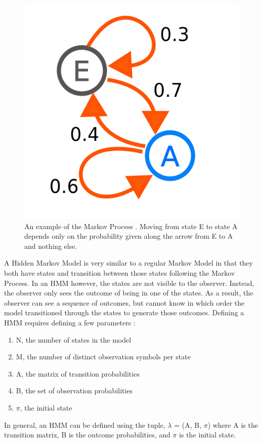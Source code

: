 \documentclass[letterpaper, 11pt]{article}%
\begin{document}
\begin{figure}
  \centering
  \includegraphics[scale=0.2]{process}
  \caption[Markov Process]
  {An example of the Markov Process \cite{markov}. Moving from state E to state A depends only on the probability given along the arrow from E to A and nothing else. }
\end{figure}  

A Hidden Markov Model is very similar to a regular Markov Model in that they both have states and transition between those states following the Markov Process. In an HMM however, the states are not visible to the observer. Instead, the observer only sees the outcome of being in one of the states. As a result, the observer can see a sequence of outcomes, but cannot know in which order the model transitioned through the states to generate those outcomes. 
Defining a HMM requires defining a few parameters \cite{Rabiner}:
\begin{enumerate}
  \item
  N, the number of states in the model
  \item
  M, the number of distinct observation symbols per state
  \item
  A, the matrix of transition probabilities
  \item
  B, the set of observation probabilities
  \item
  $\pi$, the initial state
\end{enumerate}
In general, an HMM can be defined using the tuple, $\lambda$ = (A, B, $\pi$) where A is the transition matrix, B is the outcome probabilities, and $\pi$ is the initial state.
\end{document}
